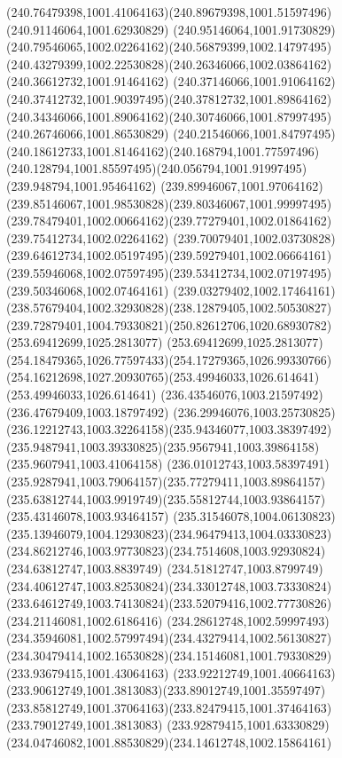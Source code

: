{{	\curveto(240.76479398,1001.41064163)(240.89679398,1001.51597496)(240.91146064,1001.62930829)
	\curveto(240.95146064,1001.91730829)(240.79546065,1002.02264162)(240.56879399,1002.14797495)
	\curveto(240.43279399,1002.22530828)(240.26346066,1002.03864162)(240.36612732,1001.91464162)
	\curveto(240.37146066,1001.91064162)(240.37412732,1001.90397495)(240.37812732,1001.89864162)
	\curveto(240.34346066,1001.89064162)(240.30746066,1001.87997495)(240.26746066,1001.86530829)
	\curveto(240.21546066,1001.84797495)(240.18612733,1001.81464162)(240.168794,1001.77597496)
	\curveto(240.128794,1001.85597495)(240.056794,1001.91997495)(239.948794,1001.95464162)
	\curveto(239.89946067,1001.97064162)(239.85146067,1001.98530828)(239.80346067,1001.99997495)
	\curveto(239.78479401,1002.00664162)(239.77279401,1002.01864162)(239.75412734,1002.02264162)
	\curveto(239.70079401,1002.03730828)(239.64612734,1002.05197495)(239.59279401,1002.06664161)
	\curveto(239.55946068,1002.07597495)(239.53412734,1002.07197495)(239.50346068,1002.07464161)
	\curveto(239.03279402,1002.17464161)(238.57679404,1002.32930828)(238.12879405,1002.50530827)
	\curveto(239.72879401,1004.79330821)(250.82612706,1020.68930782)(253.69412699,1025.2813077)
	\curveto(253.69412699,1025.2813077)(254.18479365,1026.77597433)(254.17279365,1026.99330766)
	\curveto(254.16212698,1027.20930765)(253.49946033,1026.614641)(253.49946033,1026.614641)
	\lineto(236.43546076,1003.21597492)
	\lineto(236.47679409,1003.18797492)
	\curveto(236.29946076,1003.25730825)(236.12212743,1003.32264158)(235.94346077,1003.38397492)
	\curveto(235.9487941,1003.39330825)(235.9567941,1003.39864158)(235.9607941,1003.41064158)
	\curveto(236.01012743,1003.58397491)(235.9287941,1003.79064157)(235.77279411,1003.89864157)
	\curveto(235.63812744,1003.9919749)(235.55812744,1003.93864157)(235.43146078,1003.93464157)
	\curveto(235.31546078,1004.06130823)(235.13946079,1004.12930823)(234.96479413,1004.03330823)
	\curveto(234.86212746,1003.97730823)(234.7514608,1003.92930824)(234.63812747,1003.8839749)
	\curveto(234.51812747,1003.8799749)(234.40612747,1003.82530824)(234.33012748,1003.73330824)
	\curveto(233.64612749,1003.74130824)(233.52079416,1002.77730826)(234.21146081,1002.6186416)
	\curveto(234.28612748,1002.59997493)(234.35946081,1002.57997494)(234.43279414,1002.56130827)
	\curveto(234.30479414,1002.16530828)(234.15146081,1001.79330829)(233.93679415,1001.43064163)
	\curveto(233.92212749,1001.40664163)(233.90612749,1001.3813083)(233.89012749,1001.35597497)
	\curveto(233.85812749,1001.37064163)(233.82479415,1001.37464163)(233.79012749,1001.3813083)
	\curveto(233.92879415,1001.63330829)(234.04746082,1001.88530829)(234.14612748,1002.15864161)
}}

